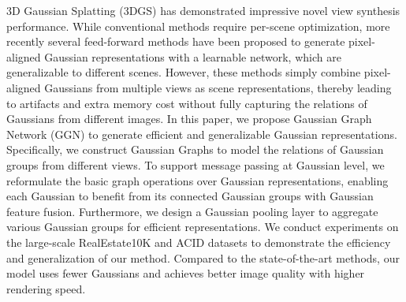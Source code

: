 3D Gaussian Splatting (3DGS) has demonstrated impressive novel view synthesis performance. 
While conventional methods require per-scene optimization, more recently several feed-forward methods have been proposed to generate pixel-aligned Gaussian representations with a learnable network, which are generalizable to different scenes. 
However, these methods simply combine pixel-aligned Gaussians from multiple views as scene representations, thereby leading to artifacts and extra memory cost without fully capturing the relations of Gaussians from different images. 
In this paper, we propose Gaussian Graph Network (GGN) to generate efficient and generalizable Gaussian representations.
Specifically, we construct Gaussian Graphs to model the relations of Gaussian groups from different views.
To support message passing at Gaussian level, we reformulate the basic graph operations over Gaussian representations, enabling each Gaussian to benefit from its connected Gaussian groups with Gaussian feature fusion.
Furthermore, we design a Gaussian pooling layer to aggregate various Gaussian groups for efficient representations.
We conduct experiments on the large-scale RealEstate10K and ACID datasets to demonstrate the efficiency and generalization of our method. Compared to the state-of-the-art methods, our model uses fewer Gaussians and achieves better image quality with higher rendering speed.
 
